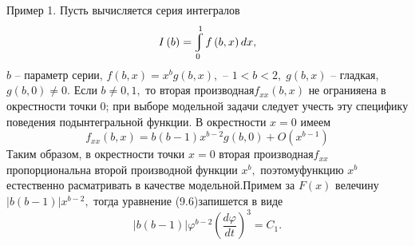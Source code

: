 \documentclass[twoside]{article}
\begin{document}
П\hspace{3pt}р\hspace{3pt}и\hspace{3pt}м\hspace{3pt}е\hspace{3pt}р 1. Пусть вычисляется серия интегралов
$$
I\left( b\right) =\varint\limits ^{1}_{0}f\left( b,x\right) dx,
$$
$b$ -- параметр серии, $f\left( b,x\right) =x^{b}g\left( b,x\right) ,$ -- $1 <b <2,\; g\left( b,x\right)$ --\linebreak
гладкая, $g\left( b,0\right) \neq 0.$ Если $b\neq 0,1,$ то вторая производная\linebreak $f_{xx}\left( b,x\right)$ не огранияена в окрестности точки 0; при выборе модельной
задачи следует учесть эту специфику поведения подынтегральной функции. В окрестности $x=0$ имеем
$$
f_{xx}\left( b,x\right) =b\left( b-1\right) x^{b-2}g\left( b,0\right) +O\left( x^{b-1}\right)
$$
Таким образом, в окрестности точки $x=0$ вторая производная\linebreak $f_{xx}$ пропорциональна второй производной функции $x^b,$
поэтому\linebreak функцию $x^b$ естественно расматривать в качестве модельной.\linebreak Примем за $F(x)$ велечину 
$\left| b\left( b-1\right) \right| x^{b-2},$ тогда уравнение (9.6)\linebreak запишется в виде
$$
\left| b\left( b-1\right) \right| \varphi ^{b-2}\left( \dfrac {d\varphi }{dt}\right) ^{3}=C_{1}.
$$
\end{document}
